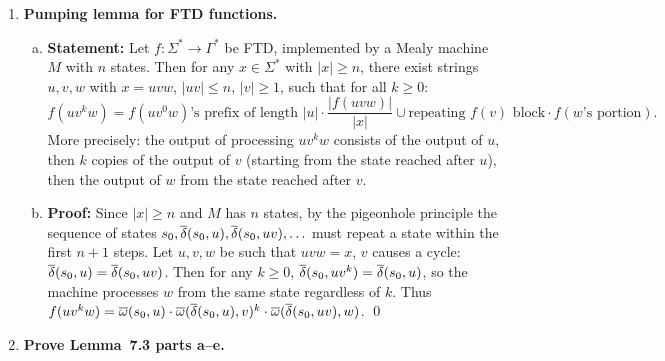 \begin{enumerate}[{7.}1.]
\begin{proof}
($\Rightarrow$) If $M$ is minimal, it is the smallest machine computing $f_M$.  Any disconnected state can be removed without changing $f_M$ (since the machine starts at $s_0$ and disconnected states are unreachable).  Any reducible machine (with two equivalent states) can be merged.  Both would yield a smaller equivalent machine, contradicting minimality.  Hence $M$ is reduced and connected.

($\Leftarrow$) If $M$ is reduced and connected, assume for contradiction there is an equivalent machine $M'$ with fewer states.  By Theorem~7.5, the minimal machine is unique (up to isomorphism); since $M$ is reduced and connected, it has no redundant states.  If $M'$ has fewer states, some states of $M$ must correspond to multiple states of $M'$ via any homomorphism, but this contradicts $M$ being reduced.  Hence $M$ is minimal. \qed
\end{proof}

\item \textbf{Pumping lemma for FTD functions.}

\begin{enumerate}[(a)]
  \item \textbf{Statement:}  Let $f:\Sigma^*\to\Gamma^*$ be FTD, implemented by a Mealy machine $M$ with $n$ states.  Then for any $x\in\Sigma^*$ with $|x|\ge n$, there exist strings $u,v,w$ with $x=uvw$, $|uv|\le n$, $|v|\ge 1$, such that for all $k\ge 0$:
  \[
    f(uv^kw) = f(uv^0w)\text{'s prefix of length }|u|\cdot\frac{|f(uvw)|}{|x|}
    \cup\text{repeating }f(v)\text{ block}\cdot f(w\text{'s portion}).
  \]
  More precisely: the output of processing $uv^kw$ consists of the output of $u$, then $k$ copies of the output of $v$ (starting from the state reached after $u$), then the output of $w$ from the state reached after $v$.

  \item \textbf{Proof:}  Since $|x|\ge n$ and $M$ has $n$ states, by the pigeonhole principle the sequence of states $s_0,\overline{\delta}(s_0,u),\overline{\delta}(s_0,uv),\ldots$ must repeat a state within the first $n+1$ steps.  Let $u,v,w$ be such that $uvw=x$, $v$ causes a cycle: $\overline{\delta}(s_0,u)=\overline{\delta}(s_0,uv)$.  Then for any $k\ge 0$, $\overline{\delta}(s_0,uv^k)=\overline{\delta}(s_0,u)$, so the machine processes $w$ from the same state regardless of $k$.  Thus $f(uv^kw)=\overline{\omega}(s_0,u)\cdot\overline{\omega}(\overline{\delta}(s_0,u),v)^k\cdot\overline{\omega}(\overline{\delta}(s_0,uv),w)$.  \qed
\end{enumerate}

\item \textbf{Prove Lemma~7.3 parts a--e.}


\end{enumerate}
